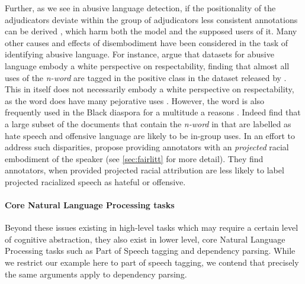 Further, as we see in abusive language detection, if the positionality of the adjudicators deviate within the group of adjudicators less consistent annotations can be derived \cite{Waseem:2016}, which harm both the model and the supposed users of it. Many other causes and effects of disembodiment have been considered in the task of identifying abusive language. For instance, \citet{Waseem:2018} argue that datasets for abusive language embody a white perspective on respectability, finding that almost all uses of the \textit{n-word} are tagged in the positive class in the dataset released by \citet{Davidson:2017}. This in itself does not necessarily embody a white perspective on respectability, as the word does have many pejorative uses \cite{Croom:2013}. However, the word is also frequently used in the Black diaspora for a multitude a reasons \cite{Croom:2013,Rahman:2012}. Indeed \citet{Waseem:2018} find that a large subset of the documents that contain the \textit{n-word} in \citet{Davidson:2017} that are labelled as hate speech and offensive language are likely to be in-group uses. In an effort to address such disparities, \citet{Sap:2019} propose providing annotators with an \textit{projected} racial embodiment of the speaker (see \autoref{sec:fairlitt} for more detail). They find annotators, when provided projected racial attribution are less likely to label projected racialized speech as hateful or offensive.

\paragraph{Core Natural Language Processing tasks}
Beyond these issues existing in high-level tasks which may require a certain level of cognitive abstraction, they also exist in lower level, core Natural Language Processing tasks such as Part of Speech tagging and dependency parsing. While we restrict our example here to part of speech tagging, we contend that precisely the same arguments apply to dependency parsing.

